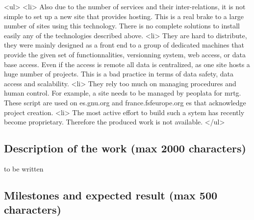\documentclass[a4paper,11pt]{report}
\begin{document}
<ul> 
<li> Also due to the number of services and their inter-relations, it is not
	simple to set up a new site that provides hosting. This is a real
	brake to a large number of sites using this technology.
	There is no complete solutions to install easily any of the technologies
	described above.
<li> They are hard to distribute, they were mainly designed as a front end to
	a group of dedicated machines that provide the given set of 
	functionnalities, versionning system, web access, or data base 
	access. Even if the access is remote all data is centralized,
	as one site hosts a huge number of projects. This is a bad
	practice in terms of data safety, data access and scalability.
<li> They rely too much on managing procedures and human control. For example, a site
	needs to be managed by peoplata for mrtg. These script are used on es.gnu.org and france.fsfeurope.org
es that acknowledge project creation.
<li> The most active effort to build such a sytem has recently become proprietary.
Therefore the produced work is not available.
</ul>
\subsection*{Description of the work (max 2000 characters)}
to be written
\subsection*{Milestones and expected result (max 500 characters)}
\end{document}
